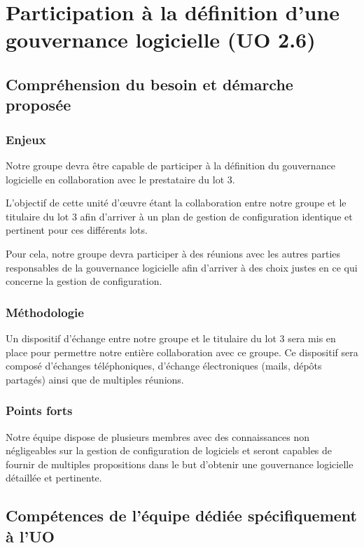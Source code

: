 	\section{Participation à la définition d’une gouvernance logicielle (UO 2.6)}
	\subsection{Compréhension du besoin et démarche proposée}
	\subsubsection{Enjeux}
	Notre groupe devra être capable de participer à la définition du gouvernance logicielle en collaboration avec le prestataire du lot \no{}3.
	
	L’objectif de cette unité d'\oe{}uvre étant la collaboration entre notre groupe et le titulaire du lot \no{}3 afin d’arriver à un plan de gestion de configuration identique et pertinent pour ces différents lots.
	
	Pour cela, notre groupe devra participer à des réunions avec les autres parties responsables de la gouvernance logicielle afin d’arriver à des choix justes en ce qui concerne la gestion de configuration.  
	
	
	\subsubsection{Méthodologie}
	Un dispositif d’échange entre notre groupe et le titulaire du lot \no{}3 sera mis en place pour permettre notre entière collaboration avec ce groupe. Ce dispositif sera composé d’échanges téléphoniques, d’échange électroniques (mails, dépôts partagés) ainsi que de multiples réunions.
	
	
	\subsubsection{Points forts}
	Notre équipe dispose de plusieurs membres avec des connaissances non négligeables sur la gestion de configuration de logiciels et seront capables de fournir de multiples propositions dans le but d’obtenir une gouvernance logicielle détaillée et pertinente.
	
	\subsection{Compétences de l'équipe dédiée spécifiquement à l'UO}	
	
